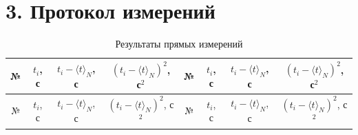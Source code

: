 \documentclass[a4paper,12pt]{article}
\begin{document}
\newpage

\section*{\hspace{30pt} 3. Протокол измерений}

\begin{longtable}{|c|c|c|c|c|c|c|c|}
    \caption{Результаты прямых измерений}
    \label{tab:measurements} \\

    \hline
    № & $t_i$, с & $t_i-\langle t \rangle_N$, с & $(t_i-\langle t \rangle_N)^2$, с$^2$
    & № & $t_i$, с & $t_i- \langle t \rangle _N$, с & $(t_i- \langle t \rangle _N)^2$, с$^2$ \\
    \hline
    \endfirsthead

    \hline
    № & $t_i$, с & $t_i- \langle t \rangle _N$, с & $(t_i- \langle t \rangle _N)^2$, с$^2$
    & № & $t_i$, с & $t_i- \langle t \rangle _N$, с & $(t_i- \langle t \rangle _N)^2$, с$^2$ \\
    \hline
    \endhead


\end{longtable}
\end{document}
